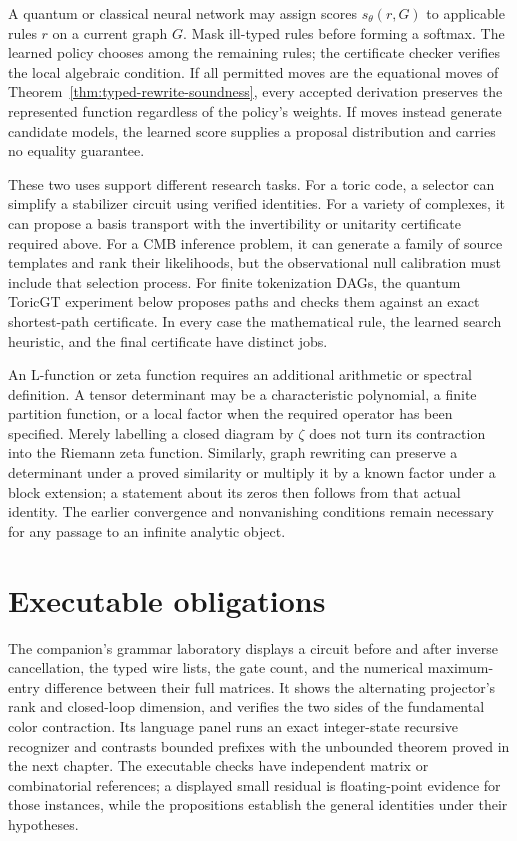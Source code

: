 A quantum or classical neural network may assign scores $s_\theta(r,G)$ to applicable rules $r$ on a current graph $G$. Mask ill-typed rules before forming a softmax. The learned policy chooses among the remaining rules; the certificate checker verifies the local algebraic condition. If all permitted moves are the equational moves of Theorem~\ref{thm:typed-rewrite-soundness}, every accepted derivation preserves the represented function regardless of the policy's weights. If moves instead generate candidate models, the learned score supplies a proposal distribution and carries no equality guarantee.

These two uses support different research tasks. For a toric code, a selector can simplify a stabilizer circuit using verified identities. For a variety of complexes, it can propose a basis transport with the invertibility or unitarity certificate required above. For a CMB inference problem, it can generate a family of source templates and rank their likelihoods, but the observational null calibration must include that selection process. For finite tokenization DAGs, the quantum ToricGT experiment below proposes paths and checks them against an exact shortest-path certificate. In every case the mathematical rule, the learned search heuristic, and the final certificate have distinct jobs.

An L-function or zeta function requires an additional arithmetic or spectral definition. A tensor determinant may be a characteristic polynomial, a finite partition function, or a local factor when the required operator has been specified. Merely labelling a closed diagram by $\zeta$ does not turn its contraction into the Riemann zeta function. Similarly, graph rewriting can preserve a determinant under a proved similarity or multiply it by a known factor under a block extension; a statement about its zeros then follows from that actual identity. The earlier convergence and nonvanishing conditions remain necessary for any passage to an infinite analytic object.

\section{Executable obligations}

The companion's grammar laboratory displays a circuit before and after inverse cancellation, the typed wire lists, the gate count, and the numerical maximum-entry difference between their full matrices. It shows the alternating projector's rank and closed-loop dimension, and verifies the two sides of the fundamental color contraction. Its language panel runs an exact integer-state recursive recognizer and contrasts bounded prefixes with the unbounded theorem proved in the next chapter. The executable checks have independent matrix or combinatorial references; a displayed small residual is floating-point evidence for those instances, while the propositions establish the general identities under their hypotheses.

